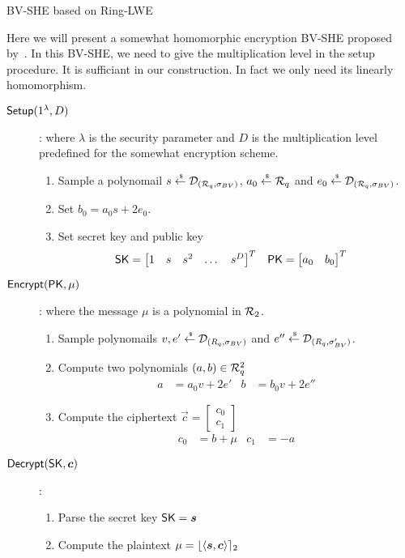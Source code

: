 \begin{subsection}{BV-SHE based on Ring-LWE~\cite{DBLP:conf/crypto/BrakerskiV11}}

  Here we will present a somewhat homomorphic encryption BV-SHE proposed by~\cite{DBLP:conf/crypto/BrakerskiV11}.
  In this BV-SHE, we need to give the multiplication level in the setup procedure.
  It is sufficiant in our construction.
  In fact we only need its linearly homomorphism.
  
  \begin{description}
  \item[${\mathsf{Setup}}(1^\lambda, D)$]: where $\lambda$ is the security parameter and $D$ is the multiplication level predefined for the somewhat encryption scheme.
    \begin{enumerate}
    \item Sample a polynomail $s \stackrel{{\scriptscriptstyle \mkern4mu \$}}{\gets} \mathcal{D}_{({\mathcal{R}}_q, \sigma_{BV})}$, $a_0 \stackrel{{\scriptscriptstyle \mkern4mu \$}}{\gets} {\mathcal{R}}_q$ and $e_0 \stackrel{{\scriptscriptstyle \mkern4mu \$}}{\gets} \mathcal{D}_{({\mathcal{R}}_q, \sigma_{BV})}$.
    \item Set $b_0 = a_0 s + 2 e_0$.
    \item Set secret key and public key
      \begin{align*}
        \mathsf{SK} &= \begin{bmatrix} 1 & s & s^2 & \dots & s^D\end{bmatrix}^T & \mathsf{PK} &= \begin{bmatrix} a_0 & b_0\end{bmatrix}^T
      \end{align*}
    \end{enumerate}
  \item[${\mathsf{Encrypt}}(\mathsf{PK}, \mu)$]: where the message $\mu$ is a polynomial in ${\mathcal{R}}_2$.
    \begin{enumerate}
    \item Sample polynomails $v,e' \stackrel{{\scriptscriptstyle \mkern4mu \$}}{\gets} \mathcal{D}_{(R_q, \sigma_{BV})}$ and $e'' \stackrel{{\scriptscriptstyle \mkern4mu \$}}{\gets}  \mathcal{D}_{(R_q, \sigma_{BV}')}$.
    \item Compute two polynomials $(a, b) \in {\mathcal{R}}_q^2$
      \begin{align*}
        a &= a_0 v + 2 e' & b &= b_0 v +2 e'' 
      \end{align*}
    \item Compute the ciphertext $\vec{c} = \begin{bmatrix} c_0 \\ c_1\end{bmatrix}$
      \begin{align*}
        c_0 &= b + \mu & c_1 &= -a
      \end{align*}
    \end{enumerate}
  \item[$\Dec(\SK, \vec{c})$]:
    \begin{enumerate}
      \item Parse the secret key $\SK = \vec{s}$
      \item Compute the plaintext $\mu = \round{\langle \vec{s}, \vec{c}\rangle}_2$
    \end{enumerate}
  \end{description}
\end{subsection}



